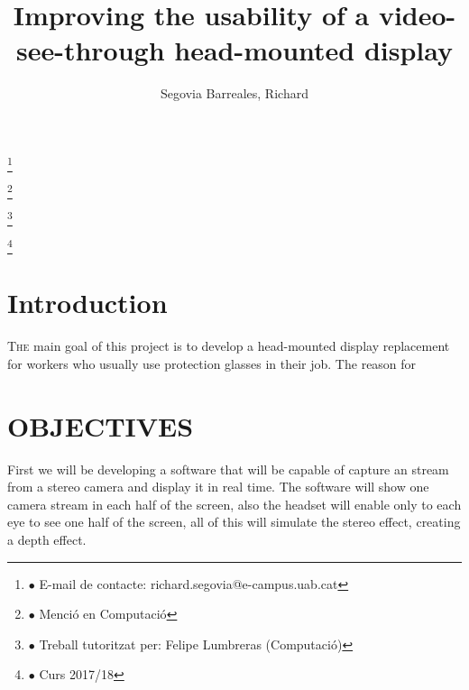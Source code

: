 \documentclass[10pt,a4paper,twocolumn,twoside]{article}
\author{\LARGE\sffamily Segovia Barreales, Richard}
\title{\Huge{\sffamily Improving the usability of a video-see-through head-mounted display}}
\date{}
\newcommand\blfootnote[1]{%
  \begingroup
  \renewcommand\thefootnote{}\footnote{#1}%
  \addtocounter{footnote}{-1}%
  \endgroup
}
\begin{document}
\fancyhead[RO]{\thepage}
\fancyhead[LE]{\thepage}

\fancyfoot[CO,CE]{}

{
   \fancyhf{}
}

\renewcommand{\headrulewidth}{0pt}
\renewcommand{\footrulewidth}{0pt}
\pagestyle{fancy}

\maketitle

\thispagestyle{primerapagina}


\blfootnote{$\bullet$ E-mail de contacte: richard.segovia@e-campus.uab.cat}
\blfootnote{$\bullet$ Menció en Computació}
\blfootnote{$\bullet$ Treball tutoritzat per: Felipe Lumbreras (Computació)}
\blfootnote{$\bullet$ Curs 2017/18}

\section{Introduction}

\lettrine[lines=3]{T}{he} main goal of this project is to develop a head-mounted display replacement for workers who usually use protection glasses in their job. The reason for 

\bigskip

\section{OBJECTIVES}


First we will be developing a software that will be capable of capture an stream from a stereo camera and display it in real time. The software will show one camera stream in each half of the screen, also the headset will enable only to each eye to see one half of the screen, all of this will simulate the stereo effect, creating a depth effect.
\end{document}
